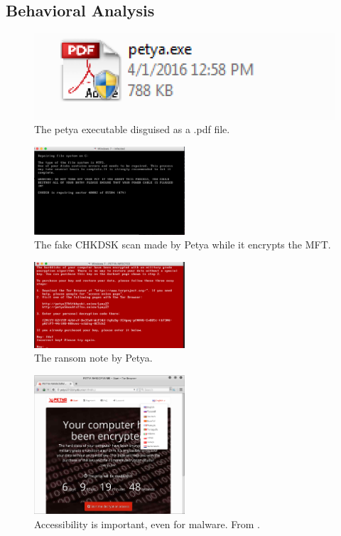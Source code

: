 \documentclass[twocolumn]{article}
\begin{document}
\subsection{Behavioral Analysis}
\begin{figure}
	\includegraphics{petya.png}
	\caption{The petya executable disguised as a .pdf file.}
	\label{fig:petya}
\end{figure}
\begin{figure}
	\includegraphics[width = 0.5\textwidth]{encryptionScreen.png}
	\caption{The fake CHKDSK scan made by Petya while it encrypts the MFT.}
	\label{fig:fakechk}
\end{figure}
\begin{figure}
	\includegraphics[width = 0.5\textwidth]{ransomScreen.png}
	\caption{The ransom note by Petya.}
	\label{fig:ransomScreen}
\end{figure}
\begin{figure}
	\includegraphics[width = 0.5\textwidth]{victimSite.png}
	\caption{Accessibility is important, even for malware. From \cite{lowLevelPetya}.}
	\label{fig:victimSite}
\end{figure}
\end{document}

